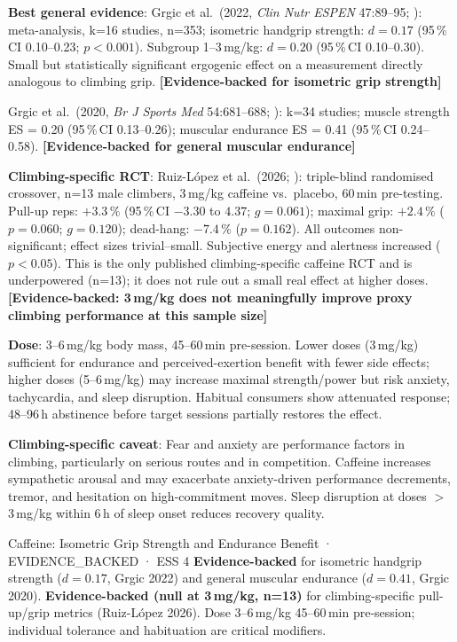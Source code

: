 \textbf{Best general evidence}: Grgic et al.\ (2022, \textit{Clin Nutr ESPEN} 47:89--95; \cite{GRG22}): meta-analysis, k=16 studies, n=353; isometric handgrip strength: $d{=}0.17$ (95\,\%\,CI 0.10--0.23; $p{<}0.001$). Subgroup 1--3\,mg/kg: $d{=}0.20$ (95\,\%\,CI 0.10--0.30). Small but statistically significant ergogenic effect on a measurement directly analogous to climbing grip. \textbf{[Evidence-backed for isometric grip strength]}

Grgic et al.\ (2020, \textit{Br J Sports Med} 54:681--688; \cite{WTNZ18}): k=34 studies; muscle strength ES = 0.20 (95\,\%\,CI 0.13--0.26); muscular endurance ES = 0.41 (95\,\%\,CI 0.24--0.58). \textbf{[Evidence-backed for general muscular endurance]}

\textbf{Climbing-specific RCT}: Ruiz-L\'opez et al.\ (2026; \cite{RMME26}): triple-blind randomised crossover, n=13 male climbers, 3\,mg/kg caffeine vs.\ placebo, 60\,min pre-testing. Pull-up reps: $+3.3\,\%$ (95\,\%\,CI $-3.30$ to $4.37$; $g{=}0.061$); maximal grip: $+2.4\,\%$ ($p{=}0.060$; $g{=}0.120$); dead-hang: $-7.4\,\%$ ($p{=}0.162$). All outcomes non-significant; effect sizes trivial--small. Subjective energy and alertness increased ($p{<}0.05$). This is the only published climbing-specific caffeine RCT and is underpowered (n=13); it does not rule out a small real effect at higher doses. \textbf{[Evidence-backed: 3\,mg/kg does not meaningfully improve proxy climbing performance at this sample size]}

\textbf{Dose}: 3--6\,mg/kg body mass, 45--60\,min pre-session. Lower doses (3\,mg/kg) sufficient for endurance and perceived-exertion benefit with fewer side effects; higher doses (5--6\,mg/kg) may increase maximal strength/power but risk anxiety, tachycardia, and sleep disruption. Habitual consumers show attenuated response; 48--96\,h abstinence before target sessions partially restores the effect.

\textbf{Climbing-specific caveat}: Fear and anxiety are performance factors in climbing, particularly on serious routes and in competition. Caffeine increases sympathetic arousal and may exacerbate anxiety-driven performance decrements, tremor, and hesitation on high-commitment moves. Sleep disruption at doses $>$3\,mg/kg within 6\,h of sleep onset reduces recovery quality.

\begin{evidencebox}{Caffeine: Isometric Grip Strength and Endurance Benefit · EVIDENCE\_BACKED · ESS 4}
\textbf{Evidence-backed} for isometric handgrip strength ($d{=}0.17$, Grgic 2022) and general muscular endurance ($d{=}0.41$, Grgic 2020). \textbf{Evidence-backed (null at 3\,mg/kg, n=13)} for climbing-specific pull-up/grip metrics (Ruiz-L\'opez 2026). Dose 3--6\,mg/kg 45--60\,min pre-session; individual tolerance and habituation are critical modifiers.
\end{evidencebox}

